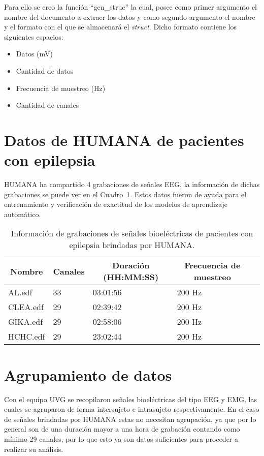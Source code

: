 Para ello se creo la función ``gen\_struc'' la cual, posee como primer argumento el nombre del documento a extraer los datos y como segundo argumento el nombre y el formato con el que se almacenará el \textit{struct}. Dicho formato contiene los siguientes espacios:
\begin{itemize}
    \item Datos (mV)
    \item Cantidad de datos
    \item Frecuencia de muestreo (Hz)
    \item Cantidad de canales
\end{itemize}

\section{Datos de HUMANA de pacientes con epilepsia }
HUMANA ha compartido 4 grabaciones de señales EEG, la información de dichas grabaciones se puede ver en el Cuadro~\ref{cuadro:tabla_edf_info}. Estos datos fueron de ayuda para el entrenamiento y verificación de exactitud de los modelos de aprendizaje automático. 

\begin{table}[H]
\begin{center}    
    \begin{tabular}{|l|l|l|l|l|}
    \hline
    \multicolumn{1}{|c|}{\textbf{Nombre}} & \multicolumn{1}{c|}{\textbf{Canales}} & \multicolumn{1}{c|}{\textbf{Duración (HH:MM:SS)}} & \multicolumn{1}{c|}{\textbf{Frecuencia de muestreo}}\\ \hline
    AL.edf  & 33  & 03:01:56 & 200 Hz   \\ \hline
    CLEA.edf& 29  & 02:39:42 & 200 Hz   \\ \hline
    GIKA.edf& 29  & 02:58:06 & 200 Hz   \\ \hline
    HCHC.edf& 29  & 23:02:44 & 200 Hz   \\ \hline
    \end{tabular}
    \caption[Información de grabaciones dadas por HUMANA]{Información de grabaciones de señales bioeléctricas de pacientes con epilepsia brindadas por HUMANA.} 
    \label{cuadro:tabla_edf_info}
\end{center}
\end{table}

\section{Agrupamiento de datos}
Con el equipo UVG se recopilaron señales bioeléctricas del tipo EEG y EMG, las cuales se agruparon de forma intersujeto e intrasujeto respectivamente. En el caso de señales brindadas por HUMANA estas no necesitan agrupación, ya que por lo general son de una duración mayor a una hora de grabación contando como mínimo 29 canales, por lo que esto ya son datos suficientes para proceder a realizar su análisis.

